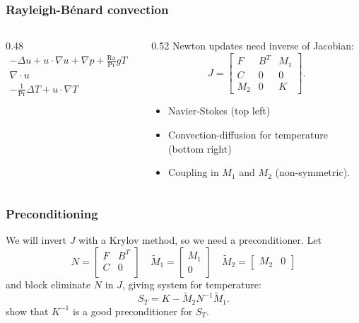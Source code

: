 \documentclass[presentation]{beamer}
\begin{document}
\begin{frame}[fragile]
  \frametitle{Rayleigh-B\'enard convection}

  \begin{columns}
    \begin{column}{0.48\framewidth}
        \small
        \begin{equation*}
          \begin{split}
            -\Delta u + u\cdot\nabla u + \nabla p +
            \frac{\text{Ra}}{\text{Pr}} \hat{g}T &= 0 \\
            \nabla \cdot u &= 0 \\
            - \frac{1}{\text{Pr}} \Delta T + u\cdot \nabla T &= 0
          \end{split}
        \end{equation*}
    \end{column}
    \begin{column}{0.52\framewidth}
  Newton updates need inverse of Jacobian:
  \begin{equation*}
    J = \begin{bmatrix}
      F   & B^T & M_1 \\
      C   & 0   & 0   \\
      M_2 & 0   & K
    \end{bmatrix}.
  \end{equation*}
  \begin{itemize}
  \item Navier-Stokes (top left)
  \item Convection-diffusion for temperature (bottom right)
  \item Coupling in $M_1$ and $M_2$ (non-symmetric).
  \end{itemize}
    \end{column}
  \end{columns}
\end{frame}
\begin{frame}
  \frametitle{Preconditioning}
  We will invert $J$ with a Krylov method, so we need a
  preconditioner.
  Let
  \begin{equation*}
    N = \begin{bmatrix}
      F & B^T\\
      C & 0 \\
    \end{bmatrix} \quad
    \tilde{M}_1 =
    \begin{bmatrix}
      M_1 \\
      0
    \end{bmatrix} \quad
    \tilde{M}_2 = \begin{bmatrix}
      M_2 & 0
    \end{bmatrix}
  \end{equation*}
  and block eliminate $N$ in $J$, giving system for temperature:
  \begin{equation*}
    S_T = K - \tilde{M}_2 N^{-1} \tilde{M}_1.
  \end{equation*}
  \textcite{Howle:2012} show that $K^{-1}$ is a good preconditioner for
  $S_T$.
\end{frame}
\end{document}
